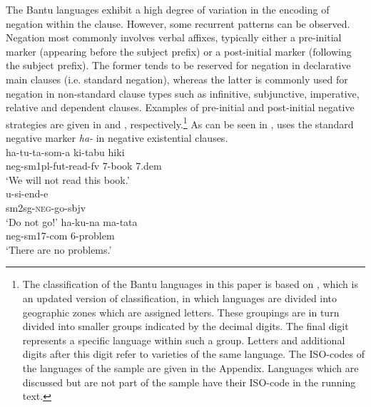 \documentclass[output=paper]{langsci/langscibook}
\begin{document}
The Bantu languages exhibit a high degree of variation in the encoding of
negation within the clause. However, some recurrent patterns can be
observed. Negation most commonly involves verbal affixes, typically either
a pre-initial marker (appearing before the subject prefix) or a
post-initial marker (following the subject prefix). The former tends to be
reserved for negation in declarative main clauses (i.e. standard negation),
whereas the latter is commonly used for negation in non-standard clause
types such as infinitive, subjunctive, imperative, relative and dependent
clauses. Examples of pre-initial and post-initial negative strategies are
given in  and ,
respectively.\footnote{The classification of the Bantu languages in this
paper is based on \citet{Maho2009}, which is an updated
version of  classification, in
which languages are divided into geographic zones which are assigned
letters. These groupings are in turn divided into smaller groups indicated
by the decimal digits. The final digit represents a specific language
within such a group. Letters and additional digits after this digit refer
to varieties of the same language. The ISO-codes of the languages of the
sample are given in  the Appendix. Languages which are
discussed but are not part of the sample have their ISO-code in the running
text.} As can be seen in ,  uses the
standard negative marker {\it ha-} in negative existential clauses.
\ea\label{ex:swahili-read-go-problem} \\
\ea\label{ex:swahili-read} 
\gll ha-tu-ta-som-a ki-tabu hiki\\ 
{\sc neg-sm}1pl-{\sc fut}-read-{\sc fv} 7-book 7.{\sc dem}\\ 
\glt `We will not read this book.'\\ 
\ex\label{ex:swahili-go} 
\gll u-si-end-e\\ 
{\sc sm2}sg-\textsc{neg}-go-{\sc sbjv}\\ 
\glt `Do not go!' 
\ex\label{ex:swahili-problem}
\gll ha-ku-na ma-tata\\ 
{\sc neg-sm17-com} 6-problem\\ 
\glt `There are no problems.' \z\z
\end{document}
